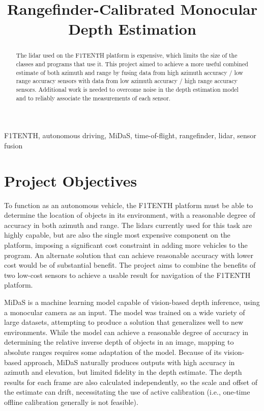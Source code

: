 \documentclass[conference]{IEEEtran}
\begin{document}
\title{Rangefinder-Calibrated Monocular Depth Estimation}

\author{
\and
\and
\and
}

\maketitle

\begin{abstract}
The lidar used on the F1TENTH platform is expensive, which limits the size of
the classes and programs that use it. This project aimed to achieve a more
useful combined estimate of both azimuth and range by fusing data from high
azimuth accuracy / low range accuracy sensors with data from low azimuth
accuracy / high range accuracy sensors. Additional work is needed to overcome
noise in the depth estimation model and to reliably associate the measurements
of each sensor.
\end{abstract}

\begin{IEEEkeywords}
F1TENTH, autonomous driving, MiDaS, time-of-flight, rangefinder, lidar, sensor
fusion
\end{IEEEkeywords}

\section{Project Objectives}
To function as an autonomous vehicle, the F1TENTH platform must be able to
determine the location of objects in its environment, with a reasonable degree
of accuracy in both azimuth and range. The lidars currently used for this task
are highly capable, but are also the single most expensive component on the
platform, imposing a significant cost constraint in adding more vehicles to the
program. An alternate solution that can achieve reasonable accuracy with lower
cost would be of substantial benefit. The project aims to combine the benefits
of two low-cost sensors to achieve a usable result for navigation of the
F1TENTH platform.

MiDaS is a machine learning model capable of vision-based depth inference,
using a monocular camera as an input. The model was trained on a wide variety
of large datasets, attempting to produce a solution that generalizes well to
new environments. While the model can achieve a reasonable degree of accuracy
in determining the relative inverse depth of objects in an image, mapping to
absolute ranges requires some adaptation of the model. Because of its
vision-based approach, MiDaS naturally produces outputs with high accuracy in
azimuth and elevation, but limited fidelity in the depth estimate. The depth
results for each frame are also calculated independently, so the scale and
offset of the estimate can drift, necessitating the use of active calibration
(i.e., one-time offline calibration generally is not feasible).
\end{document}
